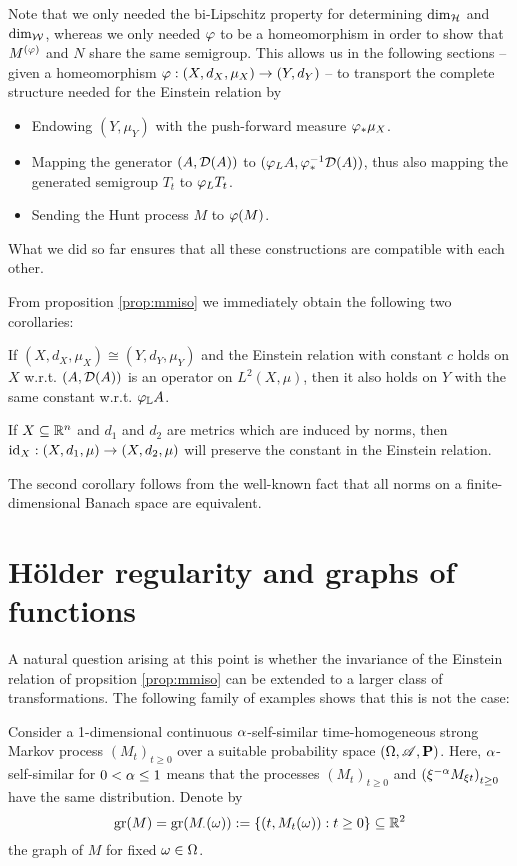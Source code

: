 \begin{rem}\label{rem:ToS}
  Note that we only needed the bi-Lipschitz property for determining 
  $\dim_{\mathcal{H}}$ and $\dim_{\mathcal{W}}$, whereas we only needed $\varphi$ to be a homeomorphism in order to show that $M^{(\varphi)}$ and $N$ share the same semigroup. This allows us in the following sections -- given a homeomorphism $\varphi:(X,d_X,\mu_X)\to(Y,d_Y)$ -- to transport the complete structure needed for the Einstein relation by 
  \begin{itemize}
    \item Endowing $(Y,\mu_Y)$ with the push-forward measure $\varphi_*\mu_X$.
    \item Mapping the generator $(A,\mathcal{D}(A))$ to 
    $(\varphi_LA,\varphi_*^{-1}\mathcal{D}(A))$, thus also mapping the generated semigroup $T_t$ to $\varphi_LT_t$.
    \item Sending the Hunt process $M$ to $\varphi(M)$. 
  \end{itemize}
  What we did so far ensures that all these constructions are compatible with each other. 
\end{rem}

From proposition \ref{prop:mmiso} we immediately obtain the following two corollaries:
\begin{cor}
  If $(X,d_X,\mu_X)\cong(Y,d_Y,\mu_Y)$ and the Einstein relation with constant $c$ holds on $X$ w.r.t. $(A,\mathcal{D}(A))$ is an operator on $L^2(X,\mu)$, then it also holds on $Y$ with the same constant w.r.t. $\varphi_{\mathbb{L}}A$. 
\end{cor}
\begin{cor}
  If $X\subseteq\mathbb{R}^n$ and $d_1$ and $d_2$ are metrics which are induced by norms, then $\operatorname{id}_X:(X,d_1,\mu)\to(X,d_2,\mu)$ will preserve the constant in the Einstein relation.
\end{cor}
The second corollary follows from the well-known fact that all norms on a finite-dimensional Banach space are equivalent. 



\section{H\"older regularity and graphs of functions}

A natural question arising at this point is whether the invariance of the Einstein relation of propsition \ref{prop:mmiso} can be extended to a larger class of transformations. The following family of examples shows that this is not the case:

Consider a 1-dimensional continuous $\alpha$-self-similar time-homogeneous strong Markov process $(M_t)_{t\geq0}$ over a suitable probability space $(\Omega,\mathscr{A},\mathbf{P})$. Here, $\alpha$-self-similar for $0<\alpha\leq1$ means that the processes 
$(M_t)_{t\geq0}$ and $\left(\xi^{-\alpha}M_{\xi t}\right)_{t\geq0}$ have the same distribution. Denote by
\[
 \operatorname{gr}(M)=\operatorname{gr}(M_\cdot(\omega)):=\left\{(t,M_t(\omega)):t\geq0 \right\}\subseteq \mathbb{R}^2
\]
the graph of $M$ for fixed $\omega\in\Omega$. 

